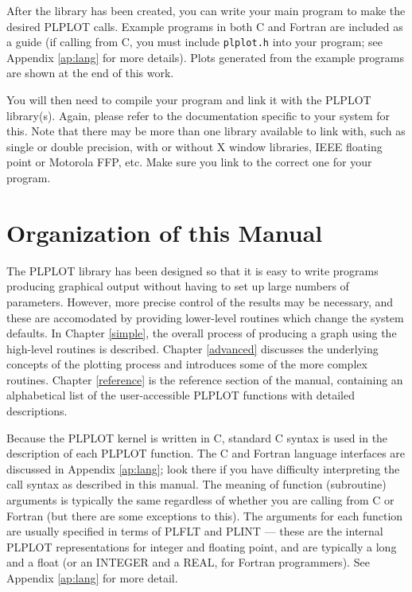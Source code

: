 After the library has been created, you can write your main program to make
the desired PLPLOT calls.  Example programs in both C and Fortran are
included as a guide (if calling from C, you must include {\tt plplot.h} into
your program; see Appendix \ref{ap:lang} for more details).  Plots generated
from the example programs are shown at the end of this work.

You will then need to compile your program and link it with the PLPLOT
library(s).  Again, please refer to the documentation specific to your
system for this.  Note that there may be more than one library available to
link with, such as single or double precision, with or without X window
libraries, IEEE floating point or Motorola FFP, etc.  Make sure you link to
the correct one for your program. 

\section {Organization of this Manual}

The PLPLOT library has been designed so that it is easy to write programs
producing graphical output without having to set up large numbers of
parameters.  However, more precise control of the results may be necessary,
and these are accomodated by providing lower-level routines which change
the system defaults.  In Chapter \ref{simple}, the overall process of
producing a graph using the high-level routines is described.  Chapter
\ref{advanced} discusses the underlying concepts of the plotting process
and introduces some of the more complex routines.  Chapter \ref{reference}
is the reference section of the manual, containing an alphabetical list of
the user-accessible PLPLOT functions with detailed descriptions. 

Because the PLPLOT kernel is written in C, standard C syntax is used in the
description of each PLPLOT function.  The C and Fortran language interfaces
are discussed in Appendix \ref{ap:lang}; look there if you have difficulty
interpreting the call syntax as described in this manual.  The meaning of
function (subroutine) arguments is typically the same regardless of whether
you are calling from C or Fortran (but there are some exceptions to this).
The arguments for each function are usually specified in terms of PLFLT and
PLINT --- these are the internal PLPLOT representations for integer and
floating point, and are typically a long and a float (or an INTEGER and a
REAL, for Fortran programmers).  See Appendix \ref{ap:lang} for more detail.

